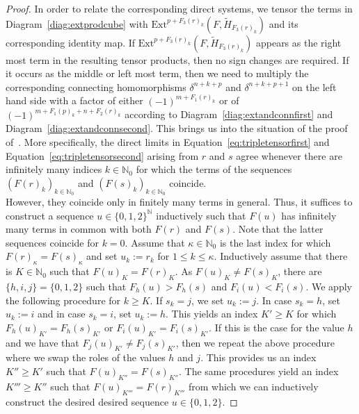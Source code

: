 \documentclass[12pt, a4paper]{article}
\numberwithin{equation}{section}
\theoremstyle{empty}
\theoremstyle{nonumberplain}
\newtheorem{proof}{Proof}
\begin{document}
\begin{proof}
In order to relate the corresponding direct systems, we tensor the terms in Diagram~\ref{diag:extprodcube} with $\mathrm{Ext}^{p+F_3(r)_k}(F, \widetilde{H}_{F_3(r)_k})$ and its corresponding identity map. If $\mathrm{Ext}^{p+F_3(r)_k}(F, \widetilde{H}_{F_3(r)_k})$ appears as the right most term in the resulting tensor  products, then no sign changes are required. If it occurs as the middle or left most term, then we need to multiply the corresponding connecting homomorphisms $\delta^{n+k+p}$ and $\delta^{n+k+p+1}$ on the left hand side with a factor of either $(-1)^{m+F_1(r)_k}$ or of $(-1)^{m+F_1(p)_k+n+F_2(r)_k}$ according to Diagram~\ref{diag:extandconnfirst} and Diagram~\ref{diag:extandconnsecond}. This brings us into the situation of the proof of~\cite[Theorem~4.15]{ghe24}. More specifically, the direct limits in Equation~\ref{eq:tripletensorfirst} and Equation~\ref{eq:tripletensorsecond} arising from $r$ and $s$ agree whenever there are infinitely many indices $k \in \mathbb{N}_0$ for which the terms of the sequences $(F(r)_k)_{k \in \mathbb{N}_0}$ and $(F(s)_k)_{k \in \mathbb{N}_0}$ coincide. \\

However, they coincide only in finitely many terms in general. Thus, it suffices to construct a sequence $u \in \lbrace 0, 1, 2 \rbrace^{\mathbb{N}}$ inductively such that $F(u)$ has infinitely many terms in common with both $F(r)$ and $F(s)$. Note that the latter sequences coincide for $k = 0$. Assume that $\kappa \in \mathbb{N}_0$ is the last index for which $F(r)_{\kappa} = F(s)_{\kappa}$ and set $u_k := r_k$ for $1 \leq k \leq \kappa$. Inductively assume that there is $K \in \mathbb{N}_0$ such that $F(u)_K = F(r)_K$. As $F(u)_K \neq F(s)_K$, there are $\lbrace h, i, j \rbrace = \lbrace 0, 1, 2 \rbrace$ such that $F_h(u) > F_h(s)$ and $F_i(u) < F_i(s)$. We apply the following procedure for $k \geq K$. If $s_k = j$, we set $u_k := j$. In case $s_k = h$, set $u_k := i$ and in case $s_k = i$, set $u_k := h$. This yields an index $K' \geq K$ for which $F_h(u)_{K'} = F_h(s)_{K'}$ or $F_i(u)_{K'} = F_i(s)_{K'}$. If this is the case for the value $h$ and we have that $F_j(u)_{K'} \neq F_j(s)_{K'}$, then we repeat the above procedure where we swap the roles of the values $h$ and $j$. This provides us an index $K'' \geq K'$ such that $F(u)_{K''} = F(s)_{K''}$. The same procedures yield an index $K''' \geq K''$ such that $F(u)_{K'''} = F(r)_{K'''}$ from which we can inductively construct the desired desired sequence $u \in \lbrace 0, 1, 2 \rbrace$.
\end{proof}
\end{document}
